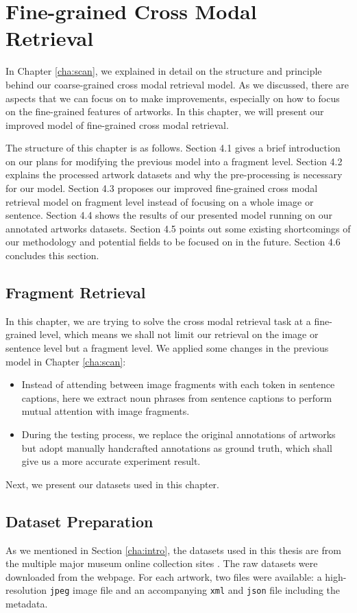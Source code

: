 \chapter{Fine-grained Cross Modal Retrieval}
\label{cha:Method}

In Chapter \ref{cha:scan}, we explained in detail on the structure and principle behind our coarse-grained cross modal retrieval model. As we discussed, there are aspects that we can focus on to make improvements, especially on how to focus on the fine-grained features of artworks. In this chapter, we will present our improved model of fine-grained cross modal retrieval.

The structure of this chapter is as follows. Section 4.1 gives a brief introduction on our plans for modifying the previous model into a fragment level. Section 4.2 explains the processed artwork datasets and why the pre-processing is necessary for our model. Section 4.3 proposes our improved fine-grained cross modal retrieval model on fragment level instead of focusing on a whole image or sentence. Section 4.4 shows the results of our presented model running on our annotated artworks datasets. Section 4.5 points out some existing shortcomings of our methodology and potential fields to be focused on in the future. Section 4.6 concludes this section.


\section{Fragment Retrieval}
In this chapter, we are trying to solve the cross modal retrieval task at a fine-grained level, which means we shall not limit our retrieval on the image or sentence level but a fragment level. We applied some changes in the previous model in Chapter \ref{cha:scan}:

\begin{itemize}
    \item Instead of attending between image fragments with each token in sentence captions, here we extract noun phrases from sentence captions to perform mutual attention with image fragments.
    \item During the testing process, we replace the original annotations of artworks but adopt manually handcrafted annotations as ground truth, which shall give us a more accurate experiment result.
\end{itemize}

Next, we present our datasets used in this chapter.

\section{Dataset Preparation}
\label{sec:dataprep}
As we mentioned in Section \ref{cha:intro}, the datasets used in this thesis are from the multiple major museum online collection sites \cite{themet,thebritishmuseum,brooklynmuseum}. The raw datasets were downloaded from the webpage. For each artwork, two files were available: a high-resolution \verb|jpeg| image file and an accompanying \verb|xml| and \verb|json| file including the metadata.

